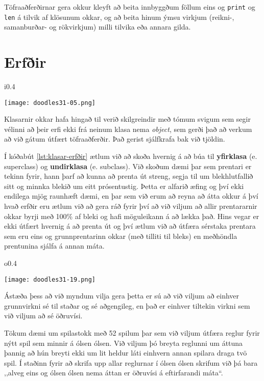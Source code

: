 Töfraaðferðirnar gera okkur kleyft að beita innbyggðum föllum eins og \texttt{print} og \texttt{len} á tilvik af klösunum okkar, og að beita hinum ýmsu virkjum (reikni-, samanburðar- og rökvirkjum) milli tilvika eða annara gilda.


\section{Erfðir}\label{uk:klasar-erfðir}
\begin{wrapfigure}{i}{0.4\textwidth} %
	\begin{center}
		\texttt{[image: doodles31-05.png]}
	\end{center}
\end{wrapfigure}
Klasarnir okkar hafa hingað til verið skilgreindir með tómum svigum sem segir vélinni að þeir erfi ekki frá neinum klasa nema \textit{object}, sem gerði það að verkum að við gátum útfært töfraaðferðir.
Það gerist sjálfkrafa bak við tjöldin.

Í kóðabút \ref{lst:klasar-erfðir} ætlum við að skoða hvernig á að búa til \textbf{yfirklasa} (e. superclass) og \textbf{undirklasa} (e. subclass).
Við skoðum dæmi þar sem prentari er tekinn fyrir, hann þarf að kunna að prenta út streng, segja til um blekhlutfallið sitt og minnka blekið um eitt prósentustig.
Þetta er alfarið æfing og því ekki endilega mjög raunhæft dæmi, en þar sem við erum að reyna að átta okkur á því hvað erfðir eru ætlum við að gera ráð fyrir því að við viljum að allir prentararnir okkar byrji með 100\% af bleki og hafi möguleikann á að lækka það.
Hins vegar er ekki útfært hvernig á að prenta út og því ætlum við að útfæra sérstaka prentara sem eru eins og grunnprentarinn okkar (með tilliti til bleks) en meðhöndla prentunina sjálfa á annan máta.
\begin{wrapfigure}{o}{0.4\textwidth} %
	\begin{center}
		\texttt{[image: doodles31-19.png]}
	\end{center}
\end{wrapfigure}

Ástæða þess að við myndum vilja gera þetta er sú að við viljum að einhver grunnvirkni sé til staðar og sé aðgengileg, en það er einhver tiltekin virkni sem við viljum að sé öðruvísi.

Tökum dæmi um spilastokk með 52 spilum þar sem við viljum útfæra reglur fyrir nýtt spil sem minnir á ólsen ólsen.
Við viljum þó breyta reglunni um áttuna þannig að hún breyti ekki um lit heldur láti einhvern annan spilara draga tvö spil.
Í staðinn fyrir að skrifa upp allar reglurnar í ólsen ólsen skrifum við þá bara ,,alveg eins og ólsen ólsen nema áttan er öðruvísi á eftirfarandi máta“.

